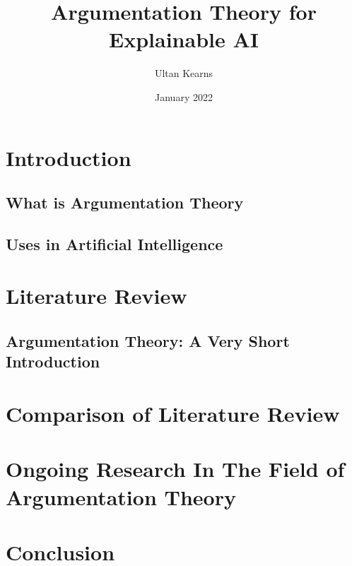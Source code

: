 \title{Argumentation Theory for Explainable AI}
\author{Ultan Kearns}
\date{January 2022}

\maketitle
\begin{abstract}
    
\end{abstract}
\section{Introduction}
\subsection{What is Argumentation Theory}
\subsection{Uses in Artificial Intelligence}
\section{Literature Review}
\subsection{Argumentation Theory: A Very Short Introduction}
\section{Comparison of Literature Review}
\section{Ongoing Research In The Field of Argumentation Theory}
\section{Conclusion}
